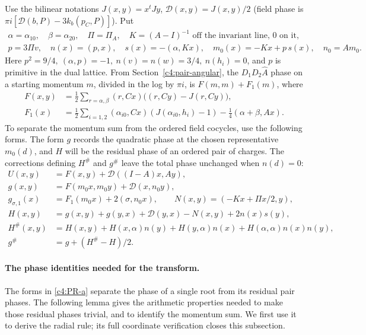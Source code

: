 Use the bilinear notations \(J(x,y)=x^t J y\), \(\mathcal D(x,y)=J(x,y)/2\) (field phase is \(\pi i[\mathcal D(b,P)-3k_b(p_C,P)]\)). Put
\[
 \begin{gathered}
 \alpha=\alpha_{10},\quad \beta=\alpha_{20},\quad
 \Pi=\Pi_A,\quad K=(A-I)^{-1}\text{ off the invariant line, }0\text{ on it},\\
 p=3\Pi v,\quad n(x)=(p,x),\quad s(x)=-(\alpha,Kx),\quad m_0(x)=-Kx+p\,s(x),\quad n_0=A m_0.
 \end{gathered}
\]
Here \(p^2=9/4,\ (\alpha,p)=-1,\ n(v)=n(w)=3/4,\ n(h_i)=0\), and \(p\) is primitive in the dual lattice. From Section~\ref{c4:pair-angular}, the \(D_1D_2\widehat A\) phase on a starting momentum \(m\), divided in the log by \(\pi i\), is \(F(m,m)+F_1(m)\), where
\[
 \begin{aligned}
 F(x,y)&=\tfrac12\sum_{r=\alpha,\beta}(r,Cx)\big((r,Cy)-J(r,Cy)\big),\\
 F_1(x)&=\tfrac12\sum_{i=1,2}(\alpha_{i0},Cx)(J(\alpha_{i0},h_i)-1)
                                  -\tfrac14(\alpha+\beta,A x).
 \end{aligned}
\]
To separate the momentum sum from the ordered field cocycles, use the
following forms. The form \(g\) records the quadratic phase at the
chosen representative \(m_0(d)\), and \(H\) will be the residual phase
of an ordered pair of charges. The corrections defining \(H^\#\) and
\(g^\#\) leave the total phase unchanged when \(n(d)=0\):
\begin{equation}
 \begin{aligned}
 U(x,y)&=F(x,y)+\mathcal D((I-A)x,Ay),\\
 g(x,y)&=F(m_0 x,m_0 y)+\mathcal D(x,n_0 y),\\
 g_{\sigma,1}(x)&=F_1(m_0 x)+2(\sigma,n_0 x),\qquad N(x,y)=(-Kx+\Pi x/2,y),\\
 H(x,y)&=g(x,y)+g(y,x)+\mathcal D(y,x)-N(x,y)+2n(x)s(y),\\
 H^\#(x,y)&=H(x,y)+H(x,\alpha)n(y)+H(y,\alpha)n(x)+H(\alpha,\alpha)n(x)n(y),
       \\ g^\#&=g+(H^\#-H)/2 .
 \end{aligned}                                                     \label{c4:PR-a}
\end{equation}

\paragraph{The phase identities needed for the transform.}
The forms in \eqref{c4:PR-a} separate the phase of a single root from
its residual pair phases. The following lemma gives the arithmetic
properties needed to make those residual phases trivial, and to identify
the momentum sum. We first use it to derive the radial rule; its full
coordinate verification closes this subsection.

